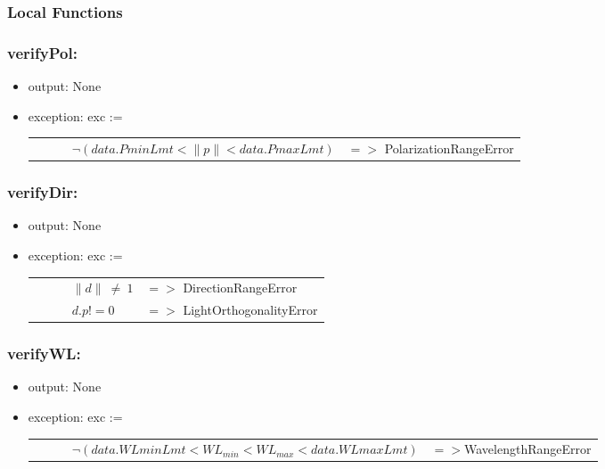 \documentclass[12pt, titlepage]{article}
\begin{document}
	\subsubsection{Local Functions}
	
	\subsubsection*{verifyPol:} \begin{itemize} \item output: None \item exception: exc := 
		\begin{longtable*}[l]{l l} \ \ \ \ \ \ $\neg(data.PminLmt< \|p\|< data.PmaxLmt)$
			& $=>$ PolarizationRangeError\\ \end{longtable*}
		
	\end{itemize}
	
	\subsubsection*{verifyDir:} \begin{itemize} \item output: None \item exception: exc := 
		\noindent \begin{longtable*}[l]{l l} \ \ \ \ \ \ $\|d\|\ \neq\ 1$ & $=>$
			DirectionRangeError\\ \ \ \ \ \ \ $d . p != 0$ & $=>$ LightOrthogonalityError\\
		\end{longtable*}
		
	\end{itemize}
	
	\subsubsection*{verifyWL:} \begin{itemize} \item output: None \item exception: exc := 
		\noindent \begin{longtable*}[l]{l l} \ \ \ \ \ \ $\neg
			(data.WLminLmt<WL_{min}<WL_{max}<data.WLmaxLmt)$ &$=>$WavelengthRangeError\\
		\end{longtable*}
		
	\end{itemize}
	
\end{document}

